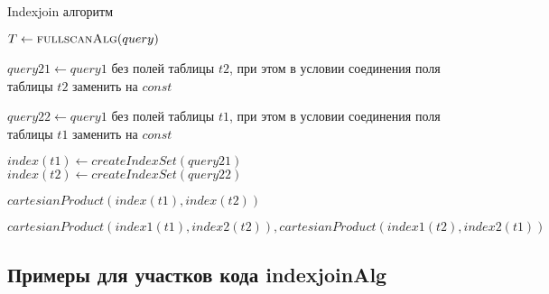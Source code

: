 \begin{algorithm}[h]
\caption{Indexjoin алгоритм}\label{alg:indexjoin}
\begin{algorithmic}[1]
 

    \State $T \gets \Call{fullscanAlg}{query}$
    \Statex 
    
    \Else
    \EndIf
    \Statex 

    \State $query21 \gets query1$ без полей таблицы $t2$, при этом в условии соединения поля таблицы $t2$ заменить на $const$
    \Statex

    \State $query22 \gets query1$ без полей таблицы $t1$, при этом в условии соединения поля таблицы $t1$ заменить на $const$
    \Statex

    \State $index(t1) \gets createIndexSet(query21)$
    \State $index(t2) \gets createIndexSet(query22)$
    \Statex

        \Statex

        \State \Return $cartesianProduct(index(t1), index(t2))$
    \EndIf
    \Statex

    \Statex{}
    \Statex{}

    \State \Return $cartesianProduct(index1(t1), index2(t2)), cartesianProduct(index1(t2), index2(t1))$
\EndFunction

\end{algorithmic}
\end{algorithm}


\subsection{Примеры для участков кода indexjoinAlg}

